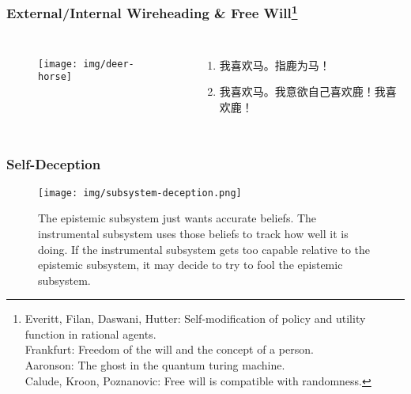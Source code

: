 \documentclass[UTF8,11pt,colorlinks,compress,openany]{beamer}%
\begin{document}
\begin{frame}\frametitle{External/Internal Wireheading \& Free Will\footnote{\tiny Everitt, Filan, Daswani, Hutter: Self-modification of policy and utility function in rational agents.\\
Frankfurt: Freedom of the will and the concept of a person.\\
Aaronson: The ghost in the quantum turing machine.\\
Calude, Kroon, Poznanovic: Free will is compatible with randomness.}}
\begin{columns}
\begin{figure}[!htbp]
\begin{flushright}
	\texttt{[image: img/deer-horse]}
\end{flushright}
\end{figure}
\begin{enumerate}
	\item 我喜欢马。指鹿为马！
	\item 我喜欢马。我意欲自己喜欢鹿！我喜欢鹿！
\end{enumerate}
\end{columns}
\begin{center}
\end{center}
\end{frame}

\begin{frame}\frametitle{Self-Deception}
\begin{figure}[H]
\texttt{[image: img/subsystem-deception.png]}\caption{The epistemic subsystem just wants accurate beliefs. The instrumental subsystem uses those beliefs to track how well it is doing. If the instrumental subsystem gets too capable relative to the epistemic subsystem, it may decide to try to fool the epistemic subsystem.}
\end{figure}
\end{frame}
\end{document}
